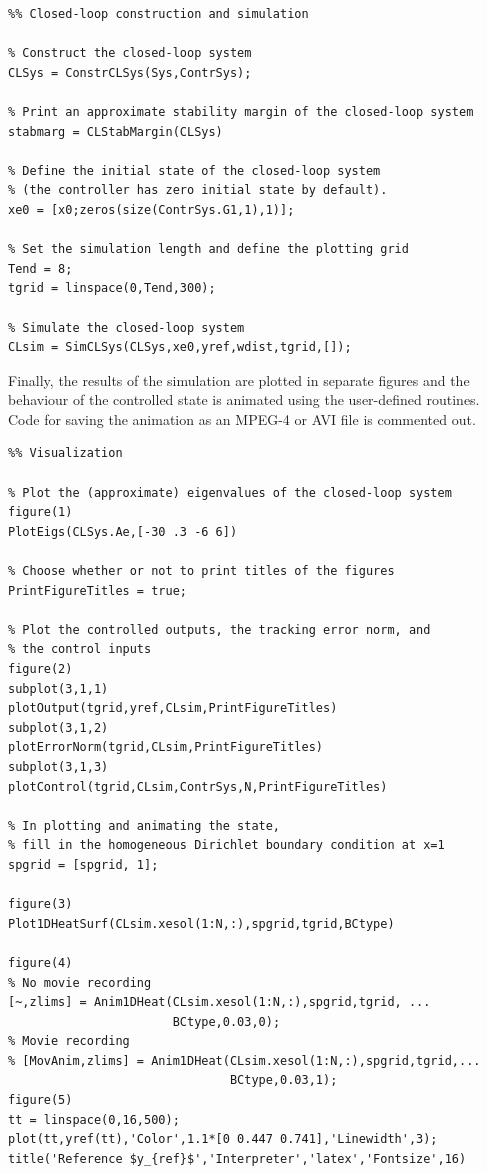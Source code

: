 \documentclass[11pt, a4paper]{amsart}
\theoremstyle{definition}
\numberwithin{equation}{section}
\begin{document}
\begin{lstlisting}
%% Closed-loop construction and simulation

% Construct the closed-loop system
CLSys = ConstrCLSys(Sys,ContrSys);

% Print an approximate stability margin of the closed-loop system
stabmarg = CLStabMargin(CLSys)

% Define the initial state of the closed-loop system
% (the controller has zero initial state by default).
xe0 = [x0;zeros(size(ContrSys.G1,1),1)];

% Set the simulation length and define the plotting grid
Tend = 8;
tgrid = linspace(0,Tend,300);

% Simulate the closed-loop system
CLsim = SimCLSys(CLSys,xe0,yref,wdist,tgrid,[]);
\end{lstlisting}

Finally, the results of the simulation are plotted in separate figures and the behaviour of the controlled state is animated using the user-defined routines. Code for saving the animation as an MPEG-4 or AVI file is commented out.

\begin{lstlisting}
%% Visualization

% Plot the (approximate) eigenvalues of the closed-loop system
figure(1)
PlotEigs(CLSys.Ae,[-30 .3 -6 6])

% Choose whether or not to print titles of the figures
PrintFigureTitles = true;

% Plot the controlled outputs, the tracking error norm, and 
% the control inputs
figure(2)
subplot(3,1,1)
plotOutput(tgrid,yref,CLsim,PrintFigureTitles)
subplot(3,1,2)
plotErrorNorm(tgrid,CLsim,PrintFigureTitles)
subplot(3,1,3)
plotControl(tgrid,CLsim,ContrSys,N,PrintFigureTitles)

% In plotting and animating the state,
% fill in the homogeneous Dirichlet boundary condition at x=1
spgrid = [spgrid, 1];

figure(3)
Plot1DHeatSurf(CLsim.xesol(1:N,:),spgrid,tgrid,BCtype)

figure(4)
% No movie recording
[~,zlims] = Anim1DHeat(CLsim.xesol(1:N,:),spgrid,tgrid, ...
                       BCtype,0.03,0);
% Movie recording
% [MovAnim,zlims] = Anim1DHeat(CLsim.xesol(1:N,:),spgrid,tgrid,...
                               BCtype,0.03,1);
figure(5)
tt = linspace(0,16,500);
plot(tt,yref(tt),'Color',1.1*[0 0.447 0.741],'Linewidth',3);
title('Reference $y_{ref}$','Interpreter','latex','Fontsize',16)
\end{lstlisting}
\end{document}
